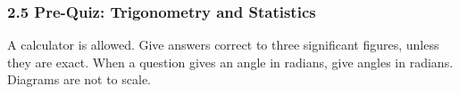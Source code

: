 \documentclass[12pt, twoside]{article}
\begin{document}
\subsubsection*{2.5 Pre-Quiz: Trigonometry and Statistics}

\begin{center}
\end{center}

A calculator is allowed. Give answers correct to three significant figures,
unless they are exact. When a question gives an angle in radians, give
angles in radians. Diagrams are not to scale.
\end{document}
